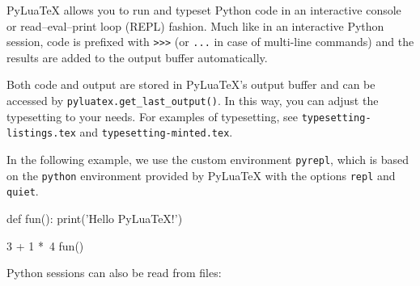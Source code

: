 \documentclass{article}
\newcommand{\pytypeset}{\directlua{pytypeset()}}
\begin{document}
PyLuaTeX allows you to run and typeset Python code in an interactive console
or read–eval–print loop (REPL) fashion. Much like in an interactive Python session,
code is prefixed with \verb|>>>| (or \verb|...| in case of multi-line commands)
and the results are added to the output buffer automatically.

Both code and output are stored in PyLuaTeX's output buffer and can be accessed
by \verb|pyluatex.get_last_output()|. In this way, you can adjust the typesetting
to your needs. For examples of typesetting, see \verb|typesetting-listings.tex|
and \verb|typesetting-minted.tex|.

In the following example, we use the custom environment \verb|pyrepl|, which is
based on the \verb|python| environment provided by PyLuaTeX with the options
\verb|repl| and \verb|quiet|.
\begin{pyrepl}
def fun():
  print('Hello PyLuaTeX!')

3 + 1 *\
4
fun()
\end{pyrepl}

Python sessions can also be read from files:
\pytypeset
\end{document}
